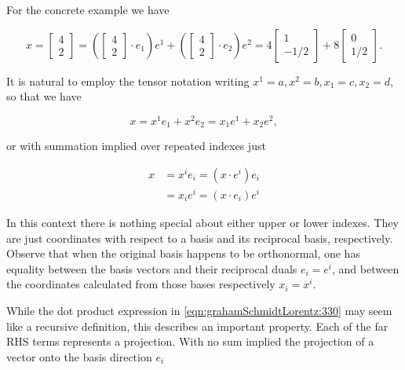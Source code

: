 For the concrete example we have

\begin{equation}\label{eqn:grahamSchmidtLorentz:290}
x = 
\begin{bmatrix}
4 \\
2
\end{bmatrix} 
=
\left(
\begin{bmatrix}
4 \\
2
\end{bmatrix} 
\cdot e_1
\right)
e^1
+
\left(
\begin{bmatrix}
4 \\
2
\end{bmatrix} 
\cdot e_2
\right)
e^2
= 4 
\begin{bmatrix}
1 \\
-1/2
\end{bmatrix} 
+ 
8
\begin{bmatrix}
0 \\
1/2
\end{bmatrix}.
\end{equation}

It is natural to employ the tensor notation writing $x^1 = a, x^2 = b, x_1 = c, x_2 = d$, so that we have

\begin{equation}\label{eqn:grahamSchmidtLorentz:310}
x = x^1 e_1 + x^2 e_2 = x_1 e^1 + x_2 e^2,
\end{equation}

or with summation implied over repeated indexes just

\begin{equation}\label{eqn:grahamSchmidtLorentz:330}
\begin{aligned}
x &= x^i e_i = (x \cdot e^i) e_i \\
  &= x_i e^i = (x \cdot e_i) e^i
\end{aligned}
\end{equation}

In this context there is nothing special about either upper or lower indexes.  They are just coordinates with respect to a basis and its reciprocal basis, respectively.  Observe that when the original basis happens to be orthonormal, one has equality between the basis vectors and their reciprocal duals $e_i = e^i$, and between the coordinates calculated from those bases respectively $x_i = x^i$.

While the dot product expression in \ref{eqn:grahamSchmidtLorentz:330} may seem like a recursive definition, this describes an important property.  Each of the far RHS terms represents a projection.  With no sum implied the projection of a vector onto the basis direction $e_i$

